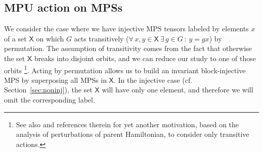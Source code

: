 \documentclass[reprint,
superscriptaddress,
amsmath,amssymb,
notitlepage,
aps,
prb,
10pt, 
tightenlines
]{revtex4-2}
\begin{document}
\subsection{MPU action on MPSs}
\label{sec:MPUonMPS}

We consider the case where we have injective MPS tensors labeled by elements $x$ of a set $\mathsf{X}$ on which $G$ acts transitively ($\forall\, x,y\in \mathsf{X}\ \exists\, g\in G \,:\ y = gx$) by permutation. The assumption of transitivity comes from the fact that otherwise the set $\mathsf{X}$ breaks into disjoint orbits, and we can reduce our study to one of those orbits \footnote{See also \cite{GarreLootensMolnar} and references therein for yet another motivation, based on the analysis of perturbations of parent Hamiltonian, to consider only transitive actions.}. Acting by permutation allows us to build an invariant block-injective MPS by superposing all MPSs in $\mathsf{X}$. In the injective case (cf. Section~\ref{sec:noninj}), the set $\mathsf{X}$ will have only one element, and therefore we will omit the corresponding label.
\end{document}
